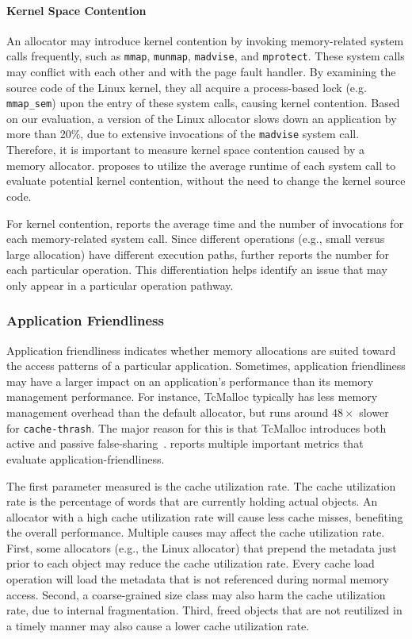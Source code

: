 \paragraph{Kernel Space Contention} 
 An allocator may introduce kernel contention by invoking memory-related system calls frequently, such as \texttt{mmap}, \texttt{munmap}, \texttt{madvise}, and \texttt{mprotect}. These system calls may conflict with each other and with the page fault handler. By examining the source code of the Linux kernel, they all acquire a process-based lock (e.g. \texttt{mmap\_sem}) upon the entry of these system calls, causing kernel contention. Based on our evaluation, a version of the Linux allocator slows down an application by more than 20\%, due to extensive invocations of the \texttt{madvise} system call. Therefore, it is important to measure kernel space contention caused by a memory allocator. \MP{} proposes to utilize the average runtime of each system call to evaluate potential kernel contention, without the need to change the kernel source code.

For kernel contention, \MP{} reports the average time and the number of invocations for each memory-related system call. Since different operations (e.g., small versus large allocation) have different execution paths, \MP{} further reports the number for each particular operation. This differentiation helps identify an issue that may only appear in a particular operation pathway. 

\subsubsection{Application Friendliness}
\label{sec: friendliness}

Application friendliness indicates whether memory allocations are suited toward the access patterns of a particular application. Sometimes, application friendliness may have a larger impact on an application's performance than its memory management performance. For instance, TcMalloc typically has less memory management overhead than the default allocator, but runs around $48\times$ slower for \texttt{cache-thrash}. The major reason for this is that TcMalloc introduces both active and passive false-sharing~\cite{tcmallocsharing}. \MP{} reports multiple important metrics that evaluate application-friendliness.


The first parameter measured is the cache utilization rate. The cache utilization rate is the percentage of words that are currently holding actual objects. An allocator with a high cache utilization rate will cause less cache misses, benefiting the overall performance. Multiple causes may affect the cache utilization rate. First, some allocators (e.g., the Linux allocator) that prepend the metadata just prior to each object may reduce the cache utilization rate. Every cache load operation will load the metadata that is not referenced during normal memory access. 
 Second, a coarse-grained size class may also harm the cache utilization rate, due to internal fragmentation. Third, freed objects that are not reutilized in a timely manner may also cause a lower cache utilization rate. 

